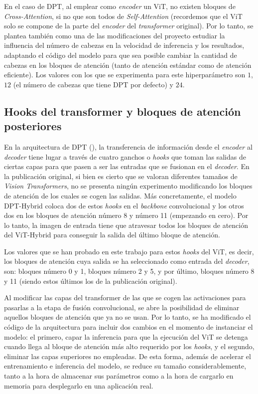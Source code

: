 En el caso de DPT, al emplear como \textit{encoder} un ViT, no existen bloques de \textit{Cross-Attention}, si no que son todos de \textit{Self-Attention} (recordemos que el ViT solo se compone de la parte del \textit{encoder} del \textit{transformer} original). Por lo tanto, se plantea también como una de las modificaciones del proyecto estudiar la influencia del número de cabezas en la velocidad de inferencia y los resultados, adaptando el código del modelo para que sea posible cambiar la cantidad de cabezas en los bloques de atención (tanto de atención estándar como de atención eficiente). Los valores con los que se experimenta para este hiperparámetro son $1$, $12$ (el número de cabezas que tiene DPT por defecto) y $24$.

\subsection{Hooks del transformer y bloques de atención posteriores}

En la arquitectura de DPT (), la transferencia de información desde el \textit{encoder} al \textit{decoder} tiene lugar a través de cuatro ganchos o \textit{hooks} que toman las salidas de ciertas capas para que pasen a ser las entradas que se fusionan en el \textit{decoder}. En la publicación original, si bien es cierto que se valoran diferentes tamaños de \textit{Vision Transformers}, no se presenta ningún experimento modificando los bloques de atención de los cuales se cogen las salidas. Más concretamente, el modelo DPT-Hybrid coloca dos de estos \textit{hooks} en el \textit{backbone} convolucional y los otros dos en los bloques de atención número 8 y número 11 (empezando en cero). Por lo tanto, la imagen de entrada tiene que atravesar todos los bloques de atención del ViT-Hybrid para conseguir la salida del último bloque de atención.

Los valores que se han probado en este trabajo para estos \textit{hooks} del ViT, es decir, los bloques de atención cuya salida se ha seleccionado como entrada del \textit{decoder}, son: bloques número 0 y 1, bloques número 2 y 5, y por último, bloques número 8 y 11 (siendo estos últimos los de la publicación original).

Al modificar las capas del transformer de las que se cogen las activaciones para pasarlas a la etapa de fusión convolucional, se abre la posibilidad de eliminar aquellos bloques de atención que ya no se usan. Por lo tanto, se ha modificado el código de la arquitectura para incluir dos cambios en el momento de instanciar el modelo: el primero, capar la inferencia para que la ejecución del ViT se detenga cuando llega al bloque de atención más alto requerido por los \textit{hooks}, y el segundo, eliminar las capas superiores no empleadas. De esta forma, además de acelerar el entrenamiento e inferencia del modelo, se reduce su tamaño considerablemente, tanto a la hora de almacenar sus parámetros como a la hora de cargarlo en memoria para desplegarlo en una aplicación real. 

